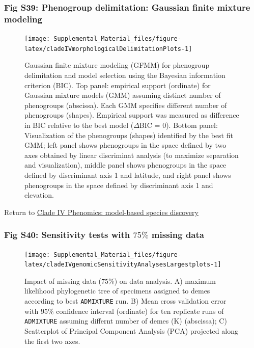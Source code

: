 \documentclass[
  11pt,
]{article}
\begin{document}
\hypertarget{fig-s39-phenogroup-delimitation-gaussian-finite-mixture-modeling}{%
\subsubsection{Fig S39: Phenogroup delimitation: Gaussian finite mixture modeling}\label{fig-s39-phenogroup-delimitation-gaussian-finite-mixture-modeling}}

\begin{figure}
\texttt{[image: Supplemental\_Material\_files/figure-latex/cladeIVmorphologicalDelimitationPlots-1]} \caption{Gaussian finite mixture modeling (GFMM) for phenogroup delimitation and model selection using the Bayesian information criterion (BIC). Top panel: empirical support (ordinate) for Gaussian mixture models (GMM) assuming distinct number of phenogroups (abscissa). Each GMM specifies different number of phenogroups (shapes). Empirical support was measured as difference in BIC relative to the best model ($\Delta$BIC = $0$). Bottom panel: Visualization of the phenogroups (shapes) identified by the best fit GMM; left panel shows phenogroups in the space defined by two axes obtained by linear discriminat analysis (to maximize separation and visualization), middle panel shows phenogroups in the space defined by discriminant axis 1 and latitude, and right panel shows phenogroups in the space defined by discriminant axis 1 and elevation.}\label{fig:cladeIVmorphologicalDelimitationPlots}
\end{figure}

Return to \protect\hyperlink{model-based-species-discovery-6}{Clade IV Phenomics: model-based species discovery}
\pagebreak

\hypertarget{fig-s40-sensitivity-tests-with-75-missing-data}{%
\subsubsection{\texorpdfstring{Fig S40: Sensitivity tests with \(75\%\) missing data}{Fig S40: Sensitivity tests with 75\textbackslash\% missing data}}\label{fig-s40-sensitivity-tests-with-75-missing-data}}

\begin{figure}
\texttt{[image: Supplemental\_Material\_files/figure-latex/cladeIVgenomicSensitivityAnalysesLargestplots-1]} \caption{Impact of missing data ($75\%$) on data analysis. A) maximum likelihood phylogenetic tree of specimens assigned to demes according to best \texttt{ADMIXTURE} run. B) Mean cross validation error with $95\%$ confidence interval (ordinate) for ten replicate runs of \texttt{ADMIXTURE} assuming differnt number of demes (K) (abscissa); C) Scatterplot of Principal Component Analysis (PCA) projected along the first two axes.}\label{fig:cladeIVgenomicSensitivityAnalysesLargestplots}
\end{figure}
\end{document}
